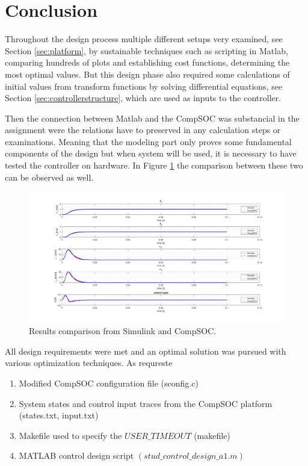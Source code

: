 
\section{Conclusion}
Throughout the design process multiple different setups very examined, see Section \ref{sec:platform}, by sustainable techniques such as scripting in Matlab, comparing hundreds of plots and establishing cost functions, determining the most optimal values. But this design phase also required some calculations of initial values from transform functions by solving differential equations, see Section \ref{sec:controllerstructure}, which are used as inputs to the controller. 

Then the connection between Matlab and the CompSOC was substancial in the assignment were the relations have to preserved in any calculation steps or examinations. Meaning that the modeling part only proves some fundamental components of the design but when system will be used, it is necessary to have tested the controller on hardware. In Figure \ref{fig:finalresult} the comparison between these two can be observed as well.

\begin{figure}[h]
	\begin{center}
		\includegraphics[width=\linewidth]{img/finalresult}
		\caption{Results comparison from Simulink and CompSOC.}
		\label{fig:finalresult}
	\end{center}
\end{figure}

All design requirements were met and an optimal solution was pursued with various optimization techniques. As requreste

\begin{enumerate}
	\item Modified CompSOC configuration file (sconfig.c)
	\item System states	and	control	input traces from the CompSOC platform (states.txt,	input.txt)
	\item Makefile used	to	specify	the	$USER\_TIMEOUT$	(makefile)
	\item MATLAB	control	design	script	$(stud\_control\_design\_a1.m)$
\end{enumerate}
